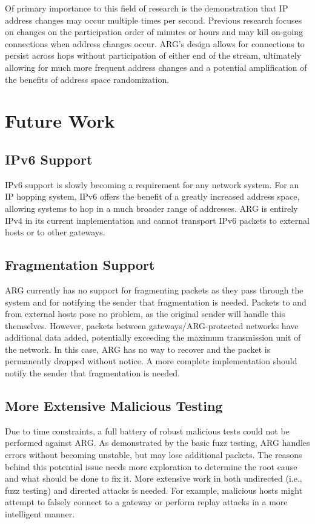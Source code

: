 \par Of primary importance to this field of research is the demonstration that \ac{IP} address changes may occur multiple times per second. Previous research focuses on changes on the participation order of minutes or hours and may kill on-going connections when address changes occur. ARG's design allows for connections to persist across hops without participation of either end of the stream, ultimately allowing for much more frequent address changes and a potential amplification of the benefits of address space randomization.

\section{Future Work}
\label{sec:future_work}
\subsection{IPv6 Support}
\par \ac{IPv6} support is slowly becoming a requirement for any network system. For an \ac{IP} hopping system, \ac{IPv6} offers the benefit of a greatly increased address space, allowing systems to hop in a much broader range of addresses. \ac{ARG} is entirely \ac{IPv4} in its current implementation and cannot transport \ac{IPv6} packets to external hosts or to other gateways.

\subsection{Fragmentation Support}
\par \ac{ARG} currently has no support for fragmenting packets as they pass through the system and for notifying the sender that fragmentation is needed. Packets to and from external hosts pose no problem, as the original sender will handle this themselves. However, packets between gateways/\ac{ARG}-protected networks have additional data added, potentially exceeding the maximum transmission unit of the network. In this case, \ac{ARG} has no way to recover and the packet is permanently dropped without notice. A more complete implementation should notify the sender that fragmentation is needed.

\subsection{More Extensive Malicious Testing}
\par Due to time constraints, a full battery of robust malicious tests could not be performed against \ac{ARG}. As demonstrated by the basic fuzz testing, \ac{ARG} handles errors without becoming unstable, but may lose additional packets. The reasons behind this potential issue needs more exploration to determine the root cause and what should be done to fix it. More extensive work in both undirected (i.e., fuzz testing) and directed attacks is needed. For example, malicious hosts might attempt to falsely connect to a gateway or perform replay attacks in a more intelligent manner.  

